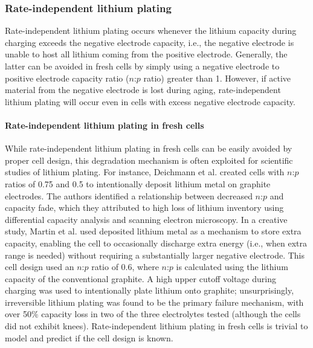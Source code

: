 \documentclass[journal=jpclcd,manuscript=article]{achemso}
\begin{document}
\subsubsection{Rate-independent lithium plating}


Rate-independent lithium plating occurs whenever the lithium capacity during charging exceeds the negative electrode capacity, i.e., the negative electrode is unable to host all lithium coming from the positive electrode. Generally, the latter can be avoided in fresh cells by simply using a negative electrode to positive electrode capacity ratio ($n$:$p$ ratio) greater than 1. However, if active material from the negative electrode is lost during aging, rate-independent lithium plating will occur even in cells with excess negative electrode capacity.

\paragraph{Rate-independent lithium plating in fresh cells}

While rate-independent lithium plating in fresh cells can be easily avoided by proper cell design, this degradation mechanism is often exploited for scientific studies of lithium plating.
For instance, Deichmann et al.\cite{deichmann_investigating_2020} created cells with $n$:$p$ ratios of 0.75 and 0.5 to intentionally deposit lithium metal on graphite electrodes. The authors identified a relationship between decreased $n$:$p$ and capacity fade, which they attributed to high loss of lithium inventory using differential capacity analysis and scanning electron microscopy. In a creative study, Martin et al.\cite{martin_cycling_2020} used deposited lithium metal as a mechanism to store extra capacity, enabling the cell to occasionally discharge extra energy (i.e., when extra range is needed) without requiring a substantially larger negative electrode. This cell design used an $n$:$p$ ratio of 0.6, where $n$:$p$ is calculated using the lithium capacity of the conventional graphite. A high upper cutoff voltage during charging was used to intentionally plate lithium onto graphite; unsurprisingly, irreversible lithium plating was found to be the primary failure mechanism, with over 50\% capacity loss in two of the three electrolytes tested (although the cells did not exhibit knees). Rate-independent lithium plating in fresh cells is trivial to model and predict if the cell design is known.
\end{document}
